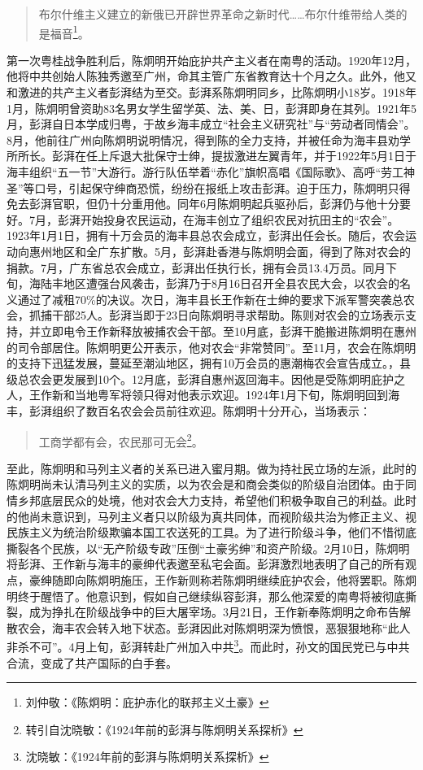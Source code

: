 \begin{quote}
布尔什维主义建立的新俄已开辟世界革命之新时代……布尔什维带给人类的是福音\footnote{刘仲敬：《陈炯明：庇护赤化的联邦主义土豪》}。
\end{quote}

第一次粤桂战争胜利后，陈炯明开始庇护共产主义者在南粤的活动。1920年12月，他将中共创始人陈独秀邀至广州，命其主管广东省教育达十个月之久。此外，他又和激进的共产主义者彭湃结为至交。彭湃系陈炯明同乡，比陈炯明小18岁。1918年1月，陈炯明曾资助83名男女学生留学英、法、美、日，彭湃即身在其列。1921年5月，彭湃自日本学成归粤，于故乡海丰成立“社会主义研究社”与“劳动者同情会”。8月，他前往广州向陈炯明说明情况，得到陈的全力支持，并被任命为海丰县劝学所所长。彭湃在任上斥退大批保守士绅，提拔激进左翼青年，并于1922年5月1日于海丰组织“五一节”大游行。游行队伍举着“赤化”旗帜高唱《国际歌》、高呼“劳工神圣”等口号，引起保守绅商恐慌，纷纷在报纸上攻击彭湃。迫于压力，陈炯明只得免去彭湃官职，但仍十分重用他。同年6月陈炯明起兵驱孙后，彭湃仍与他十分要好。7月，彭湃开始投身农民运动，在海丰创立了组织农民对抗田主的“农会”。1923年1月1日，拥有十万会员的海丰县总农会成立，彭湃出任会长。随后，农会运动向惠州地区和全广东扩散。5月，彭湃赴香港与陈炯明会面，得到了陈对农会的捐款。7月，广东省总农会成立，彭湃出任执行长，拥有会员13.4万员。同月下旬，海陆丰地区遭强台风袭击，彭湃乃于8月16日召开全县农民大会，以农会的名义通过了减租70\%的决议。次日，海丰县长王作新在士绅的要求下派军警突袭总农会，抓捕干部25人。彭湃当即于23日向陈炯明寻求帮助。陈则对农会的立场表示支持，并立即电令王作新释放被捕农会干部。至10月底，彭湃干脆搬进陈炯明在惠州的司令部居住。陈炯明更公开表示，他对农会“非常赞同”。至11月，农会在陈炯明的支持下迅猛发展，蔓延至潮汕地区，拥有10万会员的惠潮梅农会宣告成立。，县级总农会更发展到10个。12月底，彭湃自惠州返回海丰。因他是受陈炯明庇护之人，王作新和当地粤军将领只得对他表示欢迎。1924年1月下旬，陈炯明回到海丰，彭湃组织了数百名农会会员前往欢迎。陈炯明十分开心，当场表示：

\begin{quote}
工商学都有会，农民那可无会\footnote{转引自沈晓敏：《1924年前的彭湃与陈炯明关系探析》}。
\end{quote}

至此，陈炯明和马列主义者的关系已进入蜜月期。做为持社民立场的左派，此时的陈炯明尚未认清马列主义的实质，以为农会是和商会类似的阶级自治团体。由于同情乡邦底层民众的处境，他对农会大力支持，希望他们积极争取自己的利益。此时的他尚未意识到，马列主义者只以阶级为真共同体，而视阶级共治为修正主义、视民族主义为统治阶级欺骗本国工农送死的工具。为了进行阶级斗争，他们不惜彻底撕裂各个民族，以“无产阶级专政”压倒“土豪劣绅”和资产阶级。2月10日，陈炯明将彭湃、王作新与海丰的豪绅代表邀至私宅会面。彭湃激烈地表明了自己的所有观点，豪绅随即向陈炯明施压，王作新则称若陈炯明继续庇护农会，他将罢职。陈炯明终于醒悟了。他意识到，假如自己继续纵容彭湃，那么他深爱的南粤将被彻底撕裂，成为挣扎在阶级战争中的巨大屠宰场。3月21日，王作新奉陈炯明之命布告解散农会，海丰农会转入地下状态。彭湃因此对陈炯明深为愤恨，恶狠狠地称“此人非杀不可”。4月上旬，彭湃转赴广州加入中共\footnote{沈晓敏：《1924年前的彭湃与陈炯明关系探析》}。而此时，孙文的国民党已与中共合流，变成了共产国际的白手套。

